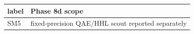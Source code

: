 \begin{tabular}{ll}
\hline
label & Phase 8d scope \\
\hline
SM5 & fixed-precision QAE/HHL scout reported separately \\
\hline
\end{tabular}
